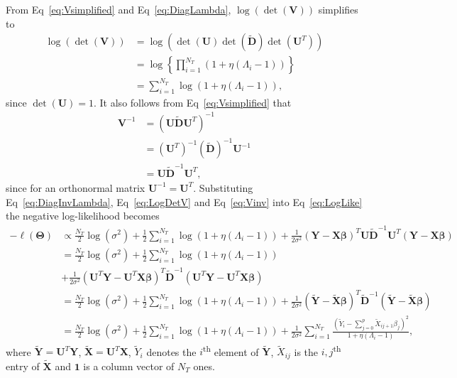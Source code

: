 \documentclass[10pt,letterpaper]{article}
\newcommand{\bX}{\textbf{X}}
\newcommand{\bY}{\textbf{Y}}
\newcommand{\bD}{\textbf{D}}
\newcommand{\bXtilde}{\widetilde{\bX}}
\newcommand{\bYtilde}{\widetilde{\bY}}
\newcommand{\Xtilde}{\widetilde{X}}
\newcommand{\Ytilde}{\widetilde{Y}}
\newcommand{\bU}{\textbf{U}}
\newcommand{\bV}{\textbf{V}}
\newcommand{\bTheta}{\boldsymbol{\Theta}}
\newcommand{\bbeta}{\boldsymbol{\beta}}
\begin{document}
From Eq~\ref{eq:Vsimplified} and Eq~\ref{eq:DiagLambda}, $\log(\det(\bV))$ simplifies to
\begin{align}
\log(\det(\bV)) & =  \log  \left(  \det(\bU) \det\left(\widetilde{\bD}\right) \det(\bU^T)\right)   \nonumber \\
& =\log\left\lbrace \prod_{i=1}^{N_T}  \left( 1 + \eta (\Lambda_i-1) \right)  \right\rbrace \nonumber \\
& = \sum_{i=1}^{N_T} \log(1 + \eta (\Lambda_i-1)) \label{eq:LogDetV},
\end{align}
since $\det(\bU) = 1$. It also follows from Eq~\ref{eq:Vsimplified} that
\begin{align}
\bV^{-1} & = \left( \bU \widetilde{\bD} \bU^T \right)^{-1} \nonumber \\
& = \left( \bU^T \right)^{-1}  \left(\widetilde{\bD}\right)^{-1}    \bU^{-1} \nonumber \\
& = \bU \widetilde{\bD}^{-1} \bU^T \label{eq:Vinv},
\end{align}
since for an orthonormal matrix $\bU^{-1} = \bU^T$. Substituting Eq~\ref{eq:DiagInvLambda}, Eq~\ref{eq:LogDetV} and Eq~\ref{eq:Vinv} into Eq~\ref{eq:LogLike} the negative log-likelihood becomes
\begin{align}
-\ell(\bTheta) & \propto \frac{N_T}{2}\log(\sigma^2) + \frac{1}{2} \sum_{i=1}^{N_T} \log(1 + \eta (\Lambda_i-1)) + \frac{1}{2\sigma^2} \left(\bY - \bX \bbeta\right)^T \bU \widetilde{\bD}^{-1} \bU^T \left(\bY - \bX \bbeta\right) \nonumber  \\
& = \frac{N_T}{2}\log(\sigma^2) + \frac{1}{2} \sum_{i=1}^{N_T} \log(1 + \eta (\Lambda_i-1)) \nonumber \\
& + \frac{1}{2\sigma^2} \left(\bU^T\bY - \bU^T\bX \bbeta\right)^T \widetilde{\bD}^{-1} \left(\bU^T\bY - \bU^T\bX \bbeta\right)  \nonumber\\
& = \frac{N_T}{2}\log(\sigma^2) + \frac{1}{2} \sum_{i=1}^{N_T} \log(1 + \eta (\Lambda_i-1)) + \frac{1}{2\sigma^2} \left(\bYtilde - \bXtilde \bbeta\right)^T \widetilde{\bD}^{-1} \left(\bYtilde - \bXtilde \bbeta\right)  \nonumber\\
& = \frac{N_T}{2}\log(\sigma^2) + \frac{1}{2} \sum_{i=1}^{N_T} \log(1 + \eta (\Lambda_i-1)) + \frac{1}{2\sigma^2} \sum_{i=1}^{N_T}\frac{\left(  \Ytilde_i - \sum_{j=0}^{p}\Xtilde_{ij+1}\beta_j \right) ^2}{1 + \eta (\Lambda_i-1)}  \label{eq:LikeFinal},
\end{align}
where $\bYtilde = \bU^T \bY$, $\bXtilde = \bU^T \bX$, $\Ytilde_i$ denotes the $i$\textsuperscript{th} element of $\bYtilde$, $\Xtilde_{ij}$ is the $i,j$\textsuperscript{th} entry of $\bXtilde$ and $\mathbf{1}$ is a column vector of $N_T$ ones.
\end{document}
